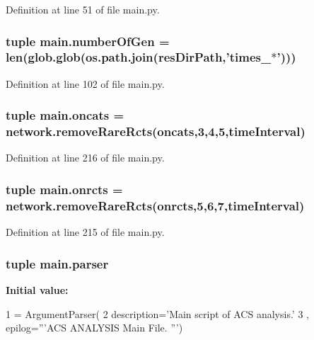 Definition at line 51 of file main.\-py.

\hypertarget{a00122_aabf82b9e9c2293000a67162becdd440d}{
\subsubsection[{number\-Of\-Gen}]{\setlength{\rightskip}{0pt plus 5cm}tuple main.\-number\-Of\-Gen = len(glob.\-glob(os.\-path.\-join({\bf res\-Dir\-Path},'times\-\_\-$\ast$')))}}\label{a00122_aabf82b9e9c2293000a67162becdd440d}


Definition at line 102 of file main.\-py.

\hypertarget{a00122_ab4d380bc4bfcb970acc39ddf18a73972}{
\subsubsection[{oncats}]{\setlength{\rightskip}{0pt plus 5cm}tuple main.\-oncats = network.\-remove\-Rare\-Rcts(oncats,3,4,5,{\bf time\-Interval})}}\label{a00122_ab4d380bc4bfcb970acc39ddf18a73972}


Definition at line 216 of file main.\-py.

\hypertarget{a00122_ab26ffc3eda5d201a779d705813b06348}{
\subsubsection[{onrcts}]{\setlength{\rightskip}{0pt plus 5cm}tuple main.\-onrcts = network.\-remove\-Rare\-Rcts(onrcts,5,6,7,{\bf time\-Interval})}}\label{a00122_ab26ffc3eda5d201a779d705813b06348}


Definition at line 215 of file main.\-py.

\hypertarget{a00122_a6596d20927a9196bbb33aef704e88297}{
\subsubsection[{parser}]{\setlength{\rightskip}{0pt plus 5cm}tuple main.\-parser}}\label{a00122_a6596d20927a9196bbb33aef704e88297}
{\bfseries Initial value\-:}
\begin{DoxyCode}
1 = ArgumentParser(
2                                 description=\textcolor{stringliteral}{'Main script of ACS analysis.'}
3                                 , epilog=\textcolor{stringliteral}{'''ACS ANALYSIS Main File. '''})
\end{DoxyCode}


